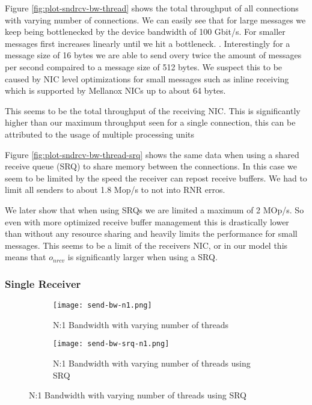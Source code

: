 Figure \ref{fig:plot-sndrcv-bw-thread} shows the total throughput of all connections with varying number of connections.
We can easily see that for large messages we keep being bottlenecked by the device bandwidth of 100 Gbit/s. For smaller
messages first increases linearly until we hit a bottleneck. . Interestingly
for a message size of 16 bytes we are able to send overy twice the amount of messages per second compaired to a message size
of 512 bytes. We suspect this to be caused by  NIC level optimizations for small messages 
such as inline receiving~\cite{anuj-guide} which is supported by Mellanox NICs up to about 64 bytes.

This seems to be the total throughput of the receiving NIC. This is significantly higher than our maximum throughput 
seen for a single connection, this can be attributed to the usage of multiple processing units~\cite{anuj-guide}


Figure \ref{fig:plot-sndrcv-bw-thread-srq} shows the same data when using a shared receive queue (SRQ) to share memory
between the connections. In this case we seem to be limited by the speed the receiver can repost receive buffers. We
had to limit all senders to about 1.8 Mop/s to not into RNR erros.

We later show that when using SRQs we are limited a maximum of 2 MOp/s. So even with more optimized receive buffer management
this is drastically lower than without any resource  sharing and heavily limits the performance for small messages. This seems
to be a limit of the receivers NIC, or in our model this means that $o_{nrcv}$ is significantly larger when using a 
SRQ. 

\subsubsection{Single Receiver}


\begin{figure}[]
\begin{subfigure}[b]{0.49\textwidth}
  \centering
  \texttt{[image: send-bw-n1.png]}
  \caption{N:1 Bandwidth with varying number of threads}
  \label{fig:plot-sndrcv-bw-n1}
\end{subfigure}
\begin{subfigure}[b]{0.49\textwidth}
  \centering
  \texttt{[image: send-bw-srq-n1.png]}
  \caption{N:1 Bandwidth with varying number of threads using SRQ}
  \label{fig:plot-sndrcv-bw-srq-n1}
\end{subfigure}
\end{figure}



